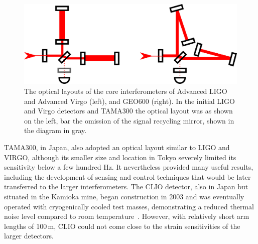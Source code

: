\begin{figure}[htb]
	\includegraphics[width=\textwidth]{Figures/detector_layouts.pdf}
	\caption{\label{fig:detector_layouts}
		The optical layouts of the core interferometers of Advanced LIGO and Advanced Virgo (left), and GEO600 (right). 
		In the initial LIGO and Virgo detectors and TAMA300 the optical layout was as shown on the left, bar the omission of the 
signal recycling mirror, shown in the diagram in gray.}
\end{figure}

TAMA300\cite{Ando_2002}, in Japan, also adopted an optical layout similar to LIGO and VIRGO, although its smaller size and location in Tokyo severely limited its sensitivity below a few hundred Hz.
It nevertheless provided many useful results, including the development of sensing and control techniques that would be later transferred to the larger interferometers. 
The CLIO detector, also in Japan but situated in the Kamioka mine, began construction in 2003 and was eventually operated with cryogenically cooled test masses, demonstrating a reduced thermal noise level compared to room temperature~\cite{Uchiyama_2012}. However, with relatively short arm lengths of 100\,m, CLIO could not come close to the strain sensitivities of the larger detectors.

